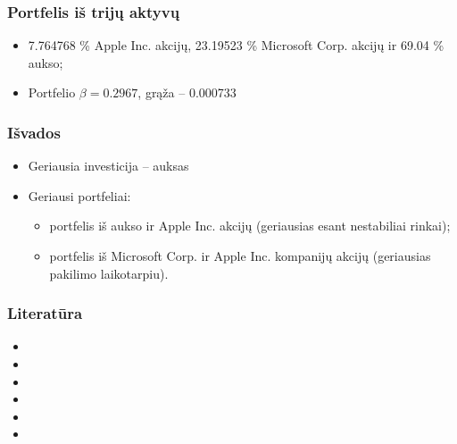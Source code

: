 \documentclass[utf8,hyperref={unicode},xcolor=dvipsnames]{beamer}
\theoremstyle{change}\newtheorem{teorema}{Teiginys}
\theoremstyle{change}\newtheorem{salyga}{}
\newcommand{\HH}{\mathrm{H}} %
\newcommand{\Hao}{\HH_{\alpha}^o}
\begin{document}
\begin{frame}
    \frametitle{Portfelis iš trijų aktyvų}
    \begin{itemize}
	\item 7.764768 \% Apple Inc. akcijų, 23.19523 \% Microsoft Corp. akcijų ir
69.04 \% aukso;
	\item Portfelio $\beta= 0.2967$, grąža -- 0.000733
    \end{itemize}
\end{frame}

\begin{frame}
    \frametitle{Išvados} 

    \begin{itemize}
\item Geriausia investicija  -- auksas

\item Geriausi portfeliai: 
\begin{itemize}
	\item portfelis iš aukso ir Apple Inc. akcijų (geriausias esant nestabiliai rinkai);
	\item portfelis iš Microsoft Corp. ir Apple Inc. kompanijų akcijų (geriausias pakilimo laikotarpiu).
\end{itemize}
    \end{itemize}

\end{frame}


\begin{frame}
    \frametitle{Literatūra} 
    \begin{itemize}
	\item 
\item 
 \item 
   \item  
\item 
\item 
    \end{itemize}
 \end{frame}
 
\end{document}
